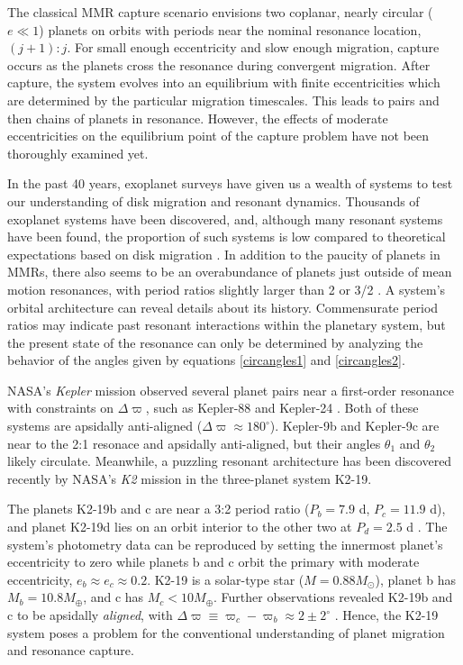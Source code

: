 \documentclass[usenatbib,twocolumn]{mnras}
\begin{document}
The classical MMR capture scenario envisions two coplanar, nearly
circular (\(e\ll 1\)) planets on orbits with periods near the nominal
resonance location, \((j+1):j\). For small enough eccentricity and slow
enough migration, capture occurs as the planets cross the resonance
during convergent migration.  After capture, the system evolves into
an equilibrium with finite eccentricities which are determined by the
particular migration timescales.  This leads to pairs and then chains
of planets in resonance.  However, the effects of moderate
eccentricities on the equilibrium point of the capture problem have
not been thoroughly examined yet.

In the past 40 years, exoplanet surveys have given us a wealth of
systems to test our understanding of disk migration and resonant
dynamics.  Thousands of exoplanet systems have been discovered, and,
although many resonant systems have been found, the proportion of such
systems is low compared to theoretical expectations based on disk
migration \citep{fabrycky_architecture_2014}.  In addition to the paucity
of planets in MMRs, there also seems to be an overabundance of planets
just outside of mean motion resonances, with period ratios slightly
larger than 2 or 3/2
\citep{fabrycky_architecture_2014,choksi_sub-neptune_2020}.  A system's
orbital architecture can reveal details about its history.
Commensurate period ratios may indicate past resonant interactions
within the planetary system, but the present state of the resonance
can only be determined by analyzing the behavior of the angles given by
equations \eqref{circangles1} and \eqref{circangles2}.  

NASA's \emph{Kepler} mission observed several planet pairs near a
first-order resonance with constraints on \(\Delta\varpi\), such as
Kepler-88 \citep{weiss_discovery_2020} and Kepler-24
\citep{antoniadou_exploiting_2020}. Both of these systems are apsidally
anti-aligned (\(\Delta\varpi\approx180^\circ\)).  Kepler-9b and
Kepler-9c are near to the 2:1 resonace and apsidally anti-aligned, but
their angles \(\theta_1\) and \(\theta_2\) likely circulate.
Meanwhile, a
puzzling resonant architecture has been discovered recently
by NASA's \emph{K2} mission in the
three-planet system K2-19.

The planets K2-19b and c are near a 3:2 period ratio (\(P_b=7.9\) d,
\(P_c=11.9\) d), and planet K2-19d lies on an orbit interior to the
other two at \(P_d=2.5\) d
\citep{howell14_k2_mission,armstrong15_one_closes_exopl_pairs_to,sinukoff16_eleven_multip_system_fromk_masses}.
The system's photometry data can be reproduced by setting the
innermost planet's eccentricity to zero while planets b and c orbit
the primary with moderate eccentricity, \(e_b\approx e_c \approx 0.2\).
K2-19 is a solar-type star
(\(M=0.88M_\odot\)), planet b has \(M_{b}=10.8 M_{\oplus}\), and c has
\(M_{c}<10M_{\oplus}\).  Further observations revealed K2-19b and
c to be apsidally \emph{aligned}, with \(\Delta\varpi\equiv
\varpi_c-\varpi_b \approx 2\pm 2^\circ\) \citep{petigura_k2-19b_2020}.
Hence, the K2-19 system poses a problem for the conventional
understanding of planet migration and resonance capture.
\end{document}
